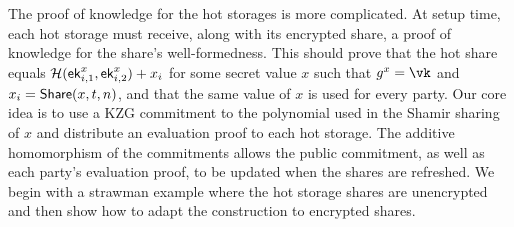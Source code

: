 The proof of knowledge for the hot storages is more complicated. At setup time, each hot storage must receive, along with its encrypted share, a proof of knowledge for the share's well-formedness. This should prove that the hot share equals $\mathcal{H}(\mathsf{ek}_{i,1}^x, \mathsf{ek}_{i,2}^x)+x_i$ for some secret value $x$ such that $g^x = \vk$ and $x_i = \mathsf{Share}(x,t,n)$, and that the same value of $x$ is used for every party. 
Our core idea is to use a KZG commitment to the polynomial used in the Shamir sharing of $x$ and distribute an evaluation proof to each hot storage. The additive homomorphism of the commitments allows the public commitment, as well as each party's evaluation proof, to be updated when the shares are refreshed. 
%
We begin with a strawman example where the hot storage shares are unencrypted and then show how to adapt the construction to encrypted shares.




